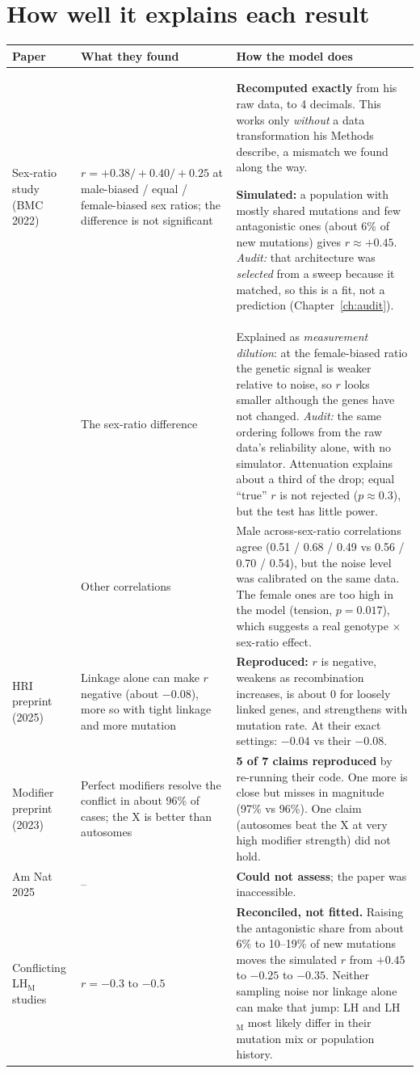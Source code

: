 \section{How well it explains each result}
\begin{longtable}{p{3.3cm}p{4.3cm}p{7.6cm}}\toprule
Paper & What they found & How the model does\\\midrule\endhead
Sex-ratio study (BMC 2022) & $r=+0.38/+0.40/+0.25$ at male-biased / equal / female-biased sex ratios; the difference is not significant & \textbf{Recomputed exactly} from his raw data, to 4 decimals. This works only \emph{without} a data transformation his Methods describe, a mismatch we found along the way.

\textbf{Simulated:} a population with mostly shared mutations and few antagonistic ones (about 6\% of new mutations) gives $r\approx+0.45$. \emph{Audit:} that architecture was \emph{selected} from a sweep because it matched, so this is a fit, not a prediction (Chapter~\ref{ch:audit}).\\
 & The sex-ratio difference & Explained as \emph{measurement dilution}: at the female-biased ratio the genetic signal is weaker relative to noise, so $r$ looks smaller although the genes have not changed. \emph{Audit:} the same ordering follows from the raw data's reliability alone, with no simulator. Attenuation explains about a third of the drop; equal ``true'' $r$ is not rejected ($p\approx0.3$), but the test has little power.\\
 & Other correlations & Male across-sex-ratio correlations agree (0.51 / 0.68 / 0.49 vs 0.56 / 0.70 / 0.54), but the noise level was calibrated on the same data. The female ones are too high in the model (tension, $p=0.017$), which suggests a real genotype $\times$ sex-ratio effect.\\
HRI preprint (2025) & Linkage alone can make $r$ negative (about $-0.08$), more so with tight linkage and more mutation & \textbf{Reproduced:} $r$ is negative, weakens as recombination increases, is about 0 for loosely linked genes, and strengthens with mutation rate. At their exact settings: $-0.04$ vs their $-0.08$.\\
Modifier preprint (2023) & Perfect modifiers resolve the conflict in about 96\% of cases; the X is better than autosomes & \textbf{5 of 7 claims reproduced} by re-running their code. One more is close but misses in magnitude (97\% vs 96\%). One claim (autosomes beat the X at very high modifier strength) did not hold.\\
Am Nat 2025 & -- & \textbf{Could not assess}; the paper was inaccessible.\\
Conflicting LH$_\mathrm{M}$ studies & $r=-0.3$ to $-0.5$ & \textbf{Reconciled, not fitted.} Raising the antagonistic share from about 6\% to 10--19\% of new mutations moves the simulated $r$ from $+0.45$ to $-0.25$ to $-0.35$. Neither sampling noise nor linkage alone can make that jump: LH and LH$_\mathrm{M}$ most likely differ in their mutation mix or population history.\\\bottomrule
\end{longtable}

